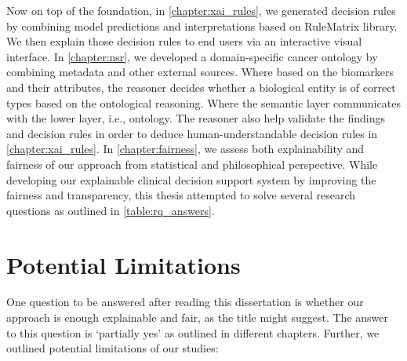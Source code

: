 \hspace*{5mm} Now on top of the foundation, in \cref{chapter:xai_rules}, we generated decision rules by combining model predictions and interpretations based on RuleMatrix library. We then explain those decision rules to end users via an interactive visual interface. In \cref{chapter:nsr}, we developed a domain-specific cancer ontology by combining metadata and other external sources. Where based on the biomarkers and their attributes, the reasoner decides whether a biological entity is of correct types based on the ontological reasoning. Where the semantic layer communicates with the lower layer, i.e., ontology. The reasoner also help validate the findings and decision rules in order to deduce human-understandable decision rules in \cref{chapter:xai_rules}. In \cref{chapter:fairness}, we assess both explainability and fairness of our approach from statistical and philosophical perspective.  While developing our explainable clinical decision support system by improving the fairness and transparency, this thesis attempted to solve several research questions as outlined in \cref{table:rq_answers}.

\section{Potential Limitations}
One question to be answered after reading this dissertation is whether our approach is enough explainable and fair, as the title might suggest. The answer to this question is `partially yes' as outlined in different chapters. Further, we outlined potential limitations of our studies:  

